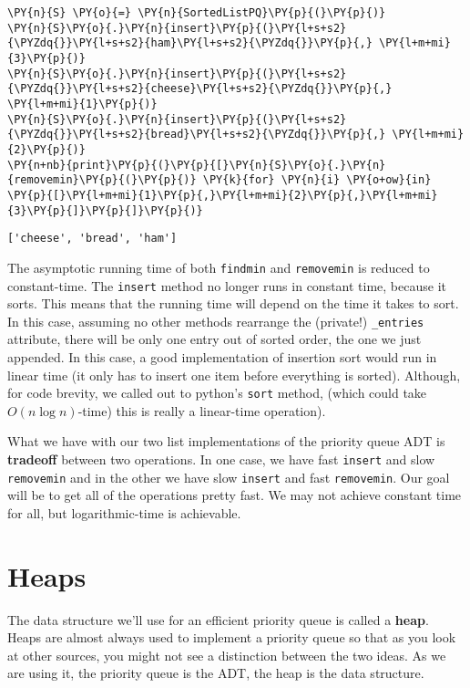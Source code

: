 \begin{Verbatim}[commandchars=\\\{\}]
\PY{n}{S} \PY{o}{=} \PY{n}{SortedListPQ}\PY{p}{(}\PY{p}{)}
\PY{n}{S}\PY{o}{.}\PY{n}{insert}\PY{p}{(}\PY{l+s+s2}{\PYZdq{}}\PY{l+s+s2}{ham}\PY{l+s+s2}{\PYZdq{}}\PY{p}{,} \PY{l+m+mi}{3}\PY{p}{)}
\PY{n}{S}\PY{o}{.}\PY{n}{insert}\PY{p}{(}\PY{l+s+s2}{\PYZdq{}}\PY{l+s+s2}{cheese}\PY{l+s+s2}{\PYZdq{}}\PY{p}{,} \PY{l+m+mi}{1}\PY{p}{)}
\PY{n}{S}\PY{o}{.}\PY{n}{insert}\PY{p}{(}\PY{l+s+s2}{\PYZdq{}}\PY{l+s+s2}{bread}\PY{l+s+s2}{\PYZdq{}}\PY{p}{,} \PY{l+m+mi}{2}\PY{p}{)}
\PY{n+nb}{print}\PY{p}{(}\PY{p}{[}\PY{n}{S}\PY{o}{.}\PY{n}{removemin}\PY{p}{(}\PY{p}{)} \PY{k}{for} \PY{n}{i} \PY{o+ow}{in} \PY{p}{[}\PY{l+m+mi}{1}\PY{p}{,}\PY{l+m+mi}{2}\PY{p}{,}\PY{l+m+mi}{3}\PY{p}{]}\PY{p}{]}\PY{p}{)}
\end{Verbatim}

\begin{Verbatim}
['cheese', 'bread', 'ham']
\end{Verbatim}


The asymptotic running time of both \texttt{findmin} and \texttt{removemin} is reduced to constant-time.  The \texttt{insert} method no longer runs in constant time, because it sorts.  This means that the running time will depend on the time it takes to sort.  In this case, assuming no other methods rearrange the (private!) \texttt{\_entries} attribute, there will be only one entry out of sorted order, the one we just appended.  In this case, a good implementation of insertion sort would run in linear time (it only has to insert one item before everything is sorted).  Although, for code brevity, we called out to python's \texttt{sort} method, (which could take $O(n \log n)$-time) this is really a linear-time operation).


What we have with our two list implementations of the priority queue ADT is \textbf{tradeoff} between two operations.  In one case, we have fast \texttt{insert} and slow \texttt{removemin} and in the other we have slow \texttt{insert} and fast \texttt{removemin}.  Our goal will be to get all of the operations pretty fast.  We may not achieve constant time for all, but logarithmic-time is achievable.

\section{Heaps}


The data structure we'll use for an efficient priority queue is called a \textbf{heap}.  Heaps are almost always used to implement a priority queue so that as you look at other sources, you might not see a distinction between the two ideas.  As we are using it, the priority queue is the ADT, the heap is the data structure.  


